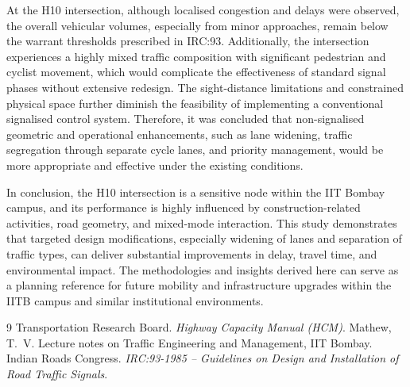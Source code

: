 \documentclass[11pt]{article}
\begin{document}
At the H10 intersection, although localised congestion and delays were observed, the overall vehicular
volumes, especially from minor approaches, remain below the warrant thresholds prescribed in IRC:93.
Additionally, the intersection experiences a highly mixed traffic composition with significant
pedestrian and cyclist movement, which would complicate the effectiveness of standard signal phases
without extensive redesign. The sight-distance limitations and constrained physical space further
diminish the feasibility of implementing a conventional signalised control system. Therefore, it was
concluded that non-signalised geometric and operational enhancements, such as lane widening, traffic
segregation through separate cycle lanes, and priority management, would be more appropriate and
effective under the existing conditions.

In conclusion, the H10 intersection is a sensitive node within the IIT Bombay campus, and its
performance is highly influenced by construction-related activities, road geometry, and mixed-mode
interaction. This study demonstrates that targeted design modifications, especially widening of lanes
and separation of traffic types, can deliver substantial improvements in delay, travel time, and
environmental impact. The methodologies and insights derived here can serve as a planning reference for
future mobility and infrastructure upgrades within the IITB campus and similar institutional
environments.

\begin{thebibliography}{9}
 Transportation Research Board. \textit{Highway Capacity Manual (HCM)}.
 Mathew, T.~V. Lecture notes on Traffic Engineering and Management, IIT Bombay.
 Indian Roads Congress. \textit{IRC:93-1985 -- Guidelines on Design and Installation of
Road Traffic Signals}.
\end{thebibliography}
\end{document}
